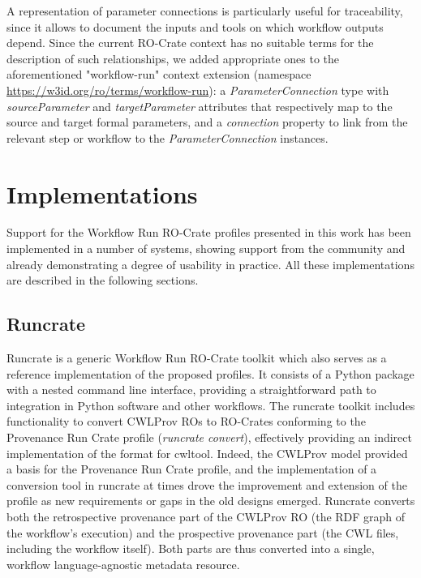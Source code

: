 \documentclass[10pt,letterpaper]{article}
\begin{document}
A representation of parameter connections is particularly useful for traceability, since it allows to document the inputs and tools on which workflow outputs depend.
Since the current RO-Crate context has no suitable terms for the description of such relationships, 
we added appropriate ones to the aforementioned  "workflow-run" context extension (namespace \url{https://w3id.org/ro/terms/workflow-run}):
a \emph{ParameterConnection} type with
\emph{sourceParameter} and \emph{targetParameter} attributes that respectively map to the source and target formal parameters, and a
\emph{connection} property to link from the relevant step or workflow to the \emph{ParameterConnection} instances.



\section{Implementations}\label{implementations}

Support for the Workflow Run RO-Crate profiles presented in this work has been implemented in a number of systems, showing support from the community and already demonstrating a degree of usability in practice.
All these implementations are described in the following sections.


\subsection{Runcrate}\label{runcrate}

Runcrate \cite{Leo 2023a} is a generic Workflow Run RO-Crate toolkit which also serves as a reference implementation of the proposed profiles.
It consists of a Python package with a nested command line interface, providing a straightforward path to integration in Python software and other workflows.
The runcrate toolkit includes functionality to convert CWLProv ROs to RO-Crates conforming to the Provenance Run Crate profile (\emph{runcrate convert}), effectively providing an indirect implementation of the format for cwltool.
Indeed, the CWLProv model provided a basis for the Provenance Run Crate profile, and the implementation of a conversion tool in runcrate at times drove the improvement and extension of the profile as new requirements or gaps in the old designs emerged.
Runcrate converts both the retrospective provenance part of the CWLProv RO (the RDF graph of the workflow's execution) and the prospective provenance part (the CWL files, including the workflow itself).
Both parts are thus converted into a single, workflow language-agnostic metadata resource.
\end{document}
